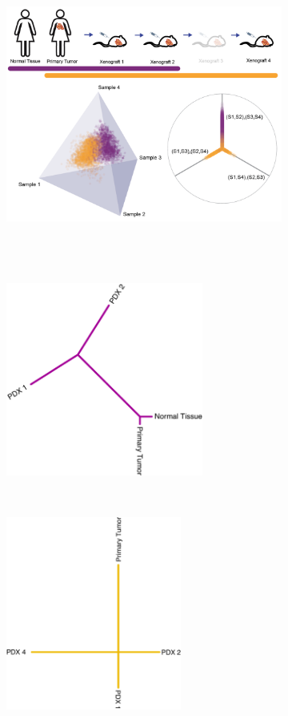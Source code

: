 \documentclass[a4paper,11pt]{article}
\begin{document}
\begin{figure}
    \begin{subfigure}{\linewidth}
    \centering
    \includegraphics[height=4in]{../figures/xenograft_single_cell.png}
    \end{subfigure}

    \begin{subfigure}{0.5\linewidth}
    \centering
    \includegraphics[height=2.5in]{../figures/xenograft_tree_purple.pdf}
    \end{subfigure}
    ~
    \begin{subfigure}{0.5\linewidth}
    \centering
    \includegraphics[height=2.5in]{../figures/xenograft_tree_gold.pdf}
    \end{subfigure}


\end{figure}
\end{document}
